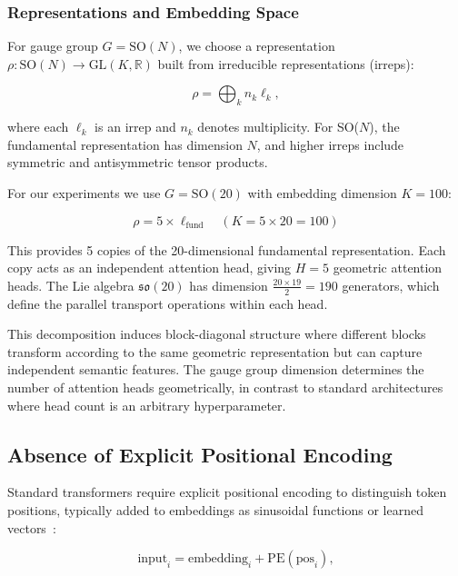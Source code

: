 \documentclass[twoside,11pt]{article}
\begin{document}
\subsubsection{Representations and Embedding Space}

For gauge group $G = \text{SO}(N)$, we choose a representation $\rho: \text{SO}(N) \to \text{GL}(K, \mathbb{R})$ built from irreducible representations (irreps):

\begin{equation}
\rho = \bigoplus_{k} n_k \ell_k,
\label{eq:representation_decomposition}
\end{equation}

where each $\ell_k$ is an irrep and $n_k$ denotes multiplicity. For SO($N$), the fundamental representation has dimension $N$, and higher irreps include symmetric and antisymmetric tensor products.

For our experiments we use $G = \text{SO}(20)$ with embedding dimension $K = 100$:

\begin{equation}
\rho = 5 \times \ell_{\text{fund}} \quad (K = 5 \times 20 = 100)
\end{equation}

This provides 5 copies of the 20-dimensional fundamental representation. Each copy acts as an independent attention head, giving $H = 5$ geometric attention heads. The Lie algebra $\mathfrak{so}(20)$ has dimension $\frac{20 \times 19}{2} = 190$ generators, which define the parallel transport operations within each head.

This decomposition induces block-diagonal structure where different blocks transform according to the same geometric representation but can capture independent semantic features. The gauge group dimension determines the number of attention heads geometrically, in contrast to standard architectures where head count is an arbitrary hyperparameter.

\subsection{Absence of Explicit Positional Encoding}

Standard transformers require explicit positional encoding to distinguish token positions, typically added to embeddings as sinusoidal functions or learned vectors~\citep{vaswani2017attention}:

\begin{equation}
\text{input}_i = \text{embedding}_i + \text{PE}(\text{pos}_i),
\end{equation}
\end{document}
